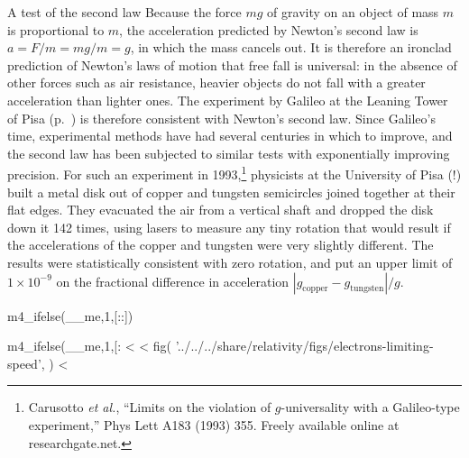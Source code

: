 \begin{eg}{A test of the second law}\label{eg:carusotto}
Because the force $mg$ of gravity on an object of mass $m$ is proportional to $m$,
the acceleration predicted by Newton's second law is $a=F/m=mg/m=g$, in which the mass
cancels out. It is therefore an ironclad prediction of Newton's laws of motion that
free fall is universal: in the absence of other forces such as air resistance,
heavier objects do not fall with a greater acceleration than lighter ones. 
The experiment by Galileo at the Leaning Tower of Pisa (p.~\pageref{fig:galileo-drops-balls})
is therefore consistent with Newton's second law. Since Galileo's time, experimental methods
have had several centuries in which to improve, and the second law has been subjected to similar
tests with exponentially improving precision. For such an experiment in 
1993,\footnote{Carusotto \emph{et al.}, ``Limits on the violation of $g$-universality with a
Galileo-type experiment,'' Phys Lett A183 (1993) 355. Freely available online at
researchgate.net.} physicists at the University of Pisa (!) built a metal disk out of
copper and tungsten semicircles joined together at their flat edges. They evacuated the air
from a vertical shaft and dropped the disk down it 142 times, using lasers to measure any
tiny rotation that would result if the accelerations of the copper and tungsten were very slightly
different. The results were statistically consistent with zero rotation, and put an upper limit
of $1\times10^{-9}$ on the fractional difference in acceleration $|g_\text{copper}-g_{\text{tungsten}}|/g$.
\end{eg}

m4_ifelse(__me,1,[:\pagebreak[4]:])

m4_ifelse(__me,1,[:
<%
<%
  fig(
    '../../../share/relativity/figs/electrons-limiting-speed',
  )
<%

